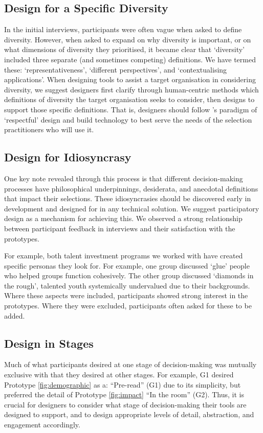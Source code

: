 \subsection{Design for a Specific Diversity}
In the initial interviews, participants were often vague when asked to define diversity. However, when asked to expand on why diversity is important, or on what dimensions of diversity they prioritised, it became clear that `diversity' included three separate (and sometimes competing) definitions. We have termed these: `representativeness', `different perspectives', and `contextualising applications'. When designing tools to assist a target organisation in considering diversity, we suggest designers first clarify through human-centric methods which definitions of diversity the target organisation seeks to consider, then designs to support those specific definitions. That is, designers should follow \textcite{VanKleek_Seymour_Binns_Shadbolt_2018}'s paradigm of `respectful' design and build technology to best serve the needs of the selection practitioners who will use it.

\subsection{Design for Idiosyncrasy}
One key note revealed through this process is that different decision-making processes have philosophical underpinnings, desiderata, and anecdotal definitions that impact their selections. These idiosyncrasies should be discovered early in development and designed for in any technical solution. We suggest participatory design as a mechanism for achieving this. We observed a strong relationship between participant feedback in interviews and their satisfaction with the prototypes.

For example, both talent investment programs we worked with have created specific personas they look for. For example, one group discussed `glue' people who helped groups function cohesively. The other group discussed `diamonds in the rough', talented youth systemically undervalued due to their backgrounds. Where these aspects were included, participants showed strong interest in the prototypes. Where they were excluded, participants often asked for these to be added.

\subsection{Design in Stages}
Much of what participants desired at one stage of decision-making was mutually exclusive with that they desired at other stages. For example, G1 desired Prototype \ref{fig:demographic} as a: ``Pre-read'' (G1) due to its simplicity, but preferred the detail of Prototype \ref{fig:impact} ``In the room'' (G2). Thus, it is crucial for designers to consider what stage of decision-making their tools are designed to support, and to design appropriate levels of detail, abstraction, and engagement accordingly.

